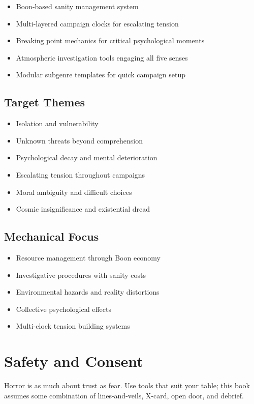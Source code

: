 \documentclass[11pt]{article}
\begin{document}
\begin{itemize}
\item Boon-based sanity management system
\item Multi-layered campaign clocks for escalating tension
\item Breaking point mechanics for critical psychological moments
\item Atmospheric investigation tools engaging all five senses
\item Modular subgenre templates for quick campaign setup
\end{itemize}

\subsection{Target Themes}

\begin{itemize}
\item Isolation and vulnerability
\item Unknown threats beyond comprehension
\item Psychological decay and mental deterioration
\item Escalating tension throughout campaigns
\item Moral ambiguity and difficult choices
\item Cosmic insignificance and existential dread
\end{itemize}

\subsection{Mechanical Focus}

\begin{itemize}
\item Resource management through Boon economy
\item Investigative procedures with sanity costs
\item Environmental hazards and reality distortions
\item Collective psychological effects
\item Multi-clock tension building systems
\end{itemize}

\section{Safety and Consent}

Horror is as much about trust as fear. Use tools that suit your table; this book assumes some combination of lines-and-veils, X-card, open door, and debrief.
\end{document}

